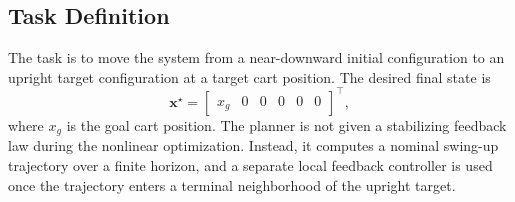 \documentclass[conference]{IEEEtran}
\begin{document}
\subsection{Task Definition}
The task is to move the system from a near-downward initial configuration to an upright target configuration at a target cart position. The desired final state is
\begin{equation}
\bm{x}^{\star}
=
\begin{bmatrix}
x_g&0&0&0&0&0
\end{bmatrix}^{\top},
\end{equation}
where $x_g$ is the goal cart position. The planner is not given a stabilizing feedback law during the nonlinear optimization. Instead, it computes a nominal swing-up trajectory over a finite horizon, and a separate local feedback controller is used once the trajectory enters a terminal neighborhood of the upright target.
\end{document}

